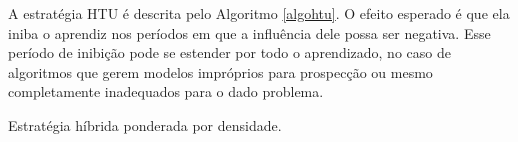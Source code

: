 A estratégia HTU é descrita pelo Algoritmo \ref{algohtu}.
O efeito esperado é que ela iniba o aprendiz nos períodos em que a influência dele possa ser negativa.
Esse período de inibição pode se estender por todo o aprendizado, no caso de algoritmos que gerem modelos impróprios para prospecção ou mesmo completamente inadequados para o dado problema.
\begin{algoritmo}
\caption{Estratégia híbrida ponderada por densidade.}
\label{algohtu}
\small
{}
\algalg{\htu{$\mathcal{U}$, $\mathcal{L}$, $\cent$}}{
 \Se{$\cent = 0$}{
  \Retorna $\mathcal{L}$
 }
 \Senao{
  $\theta = \phi(\mathcal{L})$ \\
  $\mu_{M_\theta}=\frac{1}{|\mathcal{U}|} \sum\limits_{\bm{x} \in \mathcal{U}} M_\theta(\bm{x})$ \\
  $\sigma_{M_\theta}=\frac{1}{|\mathcal{U}|} \sum\limits_{\bm{x} \in \mathcal{U}}(M_\theta(\bm{x}) - \mu_{M})^2$ \\
  $\mu_{\stratIDTU}=\frac{1}{|\mathcal{U}|} \sum\limits_{\bm{x} \in \mathcal{U}} \stratIDTU(\bm{x})$ \\
  $\sigma_{\stratIDTU}=\frac{1}{|\mathcal{U}|} \sum\limits_{\bm{x} \in \mathcal{U}}(\stratIDTU(\bm{x}) - \mu_{\stratIDTU})^2$ \\
  $\rho = (\sigma_{M_\theta}^2\cdot\sigma_{\stratIDTU}^2)^{-\frac{1}{2}} \sum\limits_{\bm{x} \in \mathcal{U}} (M_\theta(\bm{x}) - \mu_{M_\theta})(\stratIDTU(\bm{x}) - \mu_{\stratIDTU})$ \come{correlação Mar-TU}\\
}}
\end{algoritmo}
